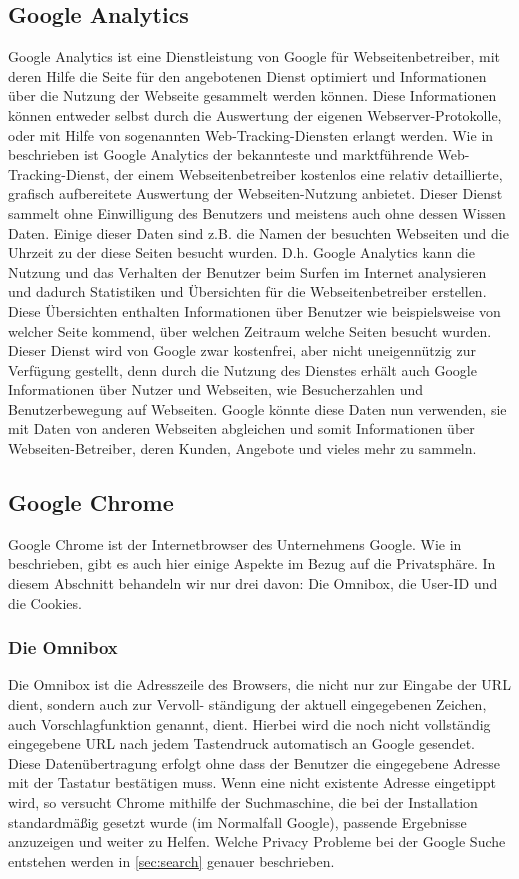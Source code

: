 \documentclass[12pt, a4paper]{llncs}
\begin{document}
	\subsection{Google Analytics}
	Google Analytics ist eine Dienstleistung von Google für Webseitenbetreiber, mit deren Hilfe die Seite für den angebotenen Dienst optimiert und Informationen über die Nutzung der Webseite gesammelt werden können. Diese Informationen können entweder selbst durch die Auswertung der eigenen Webserver-Protokolle, oder mit Hilfe von sogenannten Web-Tracking-Diensten erlangt werden.
	Wie in \cite{1} beschrieben ist Google Analytics der bekannteste und marktführende Web-Tracking-Dienst, der einem Webseitenbetreiber kostenlos eine relativ detaillierte, grafisch aufbereitete Auswertung der
	Webseiten-Nutzung anbietet. Dieser Dienst sammelt ohne Einwilligung des Benutzers und meistens auch ohne dessen Wissen Daten. Einige dieser Daten sind z.B. die Namen der besuchten Webseiten und die Uhrzeit zu der diese Seiten besucht wurden. D.h. Google Analytics kann die Nutzung und das Verhalten der Benutzer beim Surfen im Internet analysieren und dadurch Statistiken und Übersichten für die Webseitenbetreiber erstellen. Diese Übersichten enthalten Informationen über Benutzer wie beispielsweise von welcher Seite kommend, über welchen Zeitraum welche Seiten besucht wurden.
	Dieser Dienst wird von Google zwar kostenfrei, aber nicht uneigennützig zur Verfügung gestellt, denn durch die Nutzung des Dienstes erhält auch Google Informationen über Nutzer und Webseiten, wie Besucherzahlen und Benutzerbewegung auf Webseiten. Google könnte diese Daten nun verwenden, sie mit Daten von anderen Webseiten abgleichen und somit Informationen über Webseiten-Betreiber, deren Kunden, Angebote und vieles mehr zu sammeln.
	
	\subsection{Google Chrome}
	Google Chrome ist der Internetbrowser des Unternehmens Google. Wie in \cite{2} beschrieben, gibt es auch hier einige Aspekte im Bezug auf die Privatsphäre. In diesem Abschnitt behandeln wir nur drei davon: Die Omnibox, die User-ID und die Cookies. 
	
	\subsubsection{Die Omnibox}
	Die Omnibox ist die Adresszeile des Browsers, die nicht nur zur Eingabe der URL dient, sondern auch zur Vervoll- ständigung der aktuell eingegebenen Zeichen, auch Vorschlagfunktion genannt, dient. Hierbei wird die noch nicht vollständig eingegebene URL nach jedem Tastendruck automatisch an Google gesendet. Diese Datenübertragung erfolgt ohne dass der Benutzer die eingegebene Adresse mit der Tastatur bestätigen muss. Wenn eine nicht existente Adresse eingetippt wird, so versucht Chrome mithilfe der Suchmaschine, die bei der Installation standardmäßig gesetzt wurde (im Normalfall Google), passende Ergebnisse anzuzeigen und weiter zu Helfen. Welche Privacy Probleme bei der Google Suche entstehen werden in \ref{sec:search} genauer beschrieben.
\end{document}
